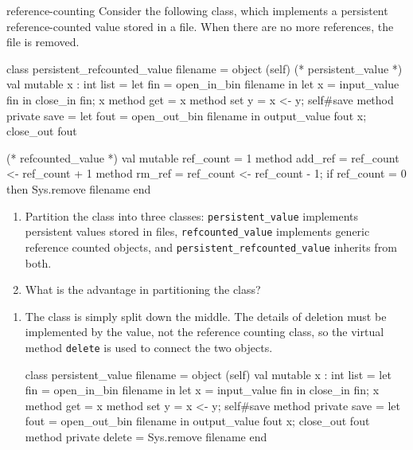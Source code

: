 %
\begin{exercise}{reference-counting}
Consider the following class, which implements a persistent
reference-counted value stored in a file.  When there are no more
references, the file is removed.

\begin{ocaml}
class persistent_refcounted_value filename =
object (self)
    (* persistent_value *)
    val mutable x : int list =
       let fin = open_in_bin filename in
       let x = input_value fin in
       close_in fin;
       x
    method get = x
    method set y = x <- y; self#save
    method private save =
       let fout = open_out_bin filename in
       output_value fout x;
       close_out fout

    (* refcounted_value *)
    val mutable ref_count = 1
    method add_ref = ref_count <- ref_count + 1
    method rm_ref =
       ref_count <- ref_count - 1;
       if ref_count = 0 then
          Sys.remove filename
end
\end{ocaml}
%
\begin{enumerate}
\item Partition the class into three classes: \hbox{\lstinline/persistent_value/} implements
persistent values stored in files, \hbox{\lstinline/refcounted_value/} implements generic reference
counted objects, and \hbox{\lstinline/persistent_refcounted_value/} inherits from both.

\item What is the advantage in partitioning the class?
\end{enumerate}

\begin{answer}\ifanswers
\begin{enumerate}
\item
The class is simply split down the middle.  The details of deletion must be implemented by
the value, not the reference counting class, so the virtual method \hbox{\lstinline/delete/} is
used to connect the two objects.

\begin{ocaml}
class persistent_value filename =
object (self)
    val mutable x : int list =
       let fin = open_in_bin filename in
       let x = input_value fin in
       close_in fin;
       x
    method get = x
    method set y = x <- y; self#save
    method private save =
       let fout = open_out_bin filename in
       output_value fout x;
       close_out fout
    method private delete = Sys.remove filename
end


\end{ocaml}
\end{enumerate}
\end{answer}
\end{exercise}
